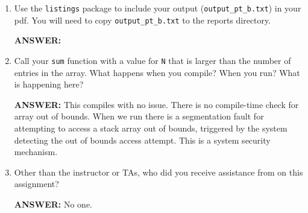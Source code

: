 \begin{enumerate}
    \item Use the \texttt{listings} package to include your output (\texttt{output\_pt\_b.txt}) in your pdf.  You will need to copy \texttt{output\_pt\_b.txt} to the reports directory.

    \textbf{ANSWER:} %
	

    \item Call your \texttt{sum} function with a value for \texttt{N} that is larger than the number of entries in the array.  What happens when you compile?  When you run?  What is happening here?

    \textbf{ANSWER:} This compiles with no issue.  There is no compile-time check for array out of bounds.  When we run there is a segmentation fault for attempting to access a stack array out of bounds, triggered by the system detecting the out of bounds access attempt.  This is a system security mechanism.

    \item Other than the instructor or TAs, who did you receive assistance from on this assignment?
    
    \textbf{ANSWER:} No one.
\end{enumerate}
